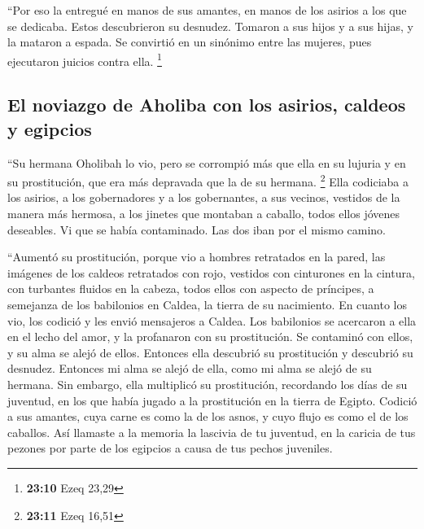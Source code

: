 \begin{paracol}{2}
 ``Por eso la entregué en manos de sus amantes, en manos
de los asirios a los que se dedicaba.  Estos descubrieron
su desnudez. Tomaron a sus hijos y a sus hijas, y la mataron a espada.
Se convirtió en un sinónimo entre las mujeres, pues ejecutaron juicios
contra ella. \footnote{\textbf{23:10} Ezeq 23,29}

\hypertarget{el-noviazgo-de-aholiba-con-los-asirios-caldeos-y-egipcios}{%
\subsection{El noviazgo de Aholiba con los asirios, caldeos y
egipcios}\label{el-noviazgo-de-aholiba-con-los-asirios-caldeos-y-egipcios}}

 ``Su hermana Oholibah lo vio, pero se corrompió más que
ella en su lujuria y en su prostitución, que era más depravada que la de
su hermana. \footnote{\textbf{23:11} Ezeq 16,51}  Ella
codiciaba a los asirios, a los gobernadores y a los gobernantes, a sus
vecinos, vestidos de la manera más hermosa, a los jinetes que montaban a
caballo, todos ellos jóvenes deseables.  Vi que se había
contaminado. Las dos iban por el mismo camino.

 ``Aumentó su prostitución, porque vio a hombres
retratados en la pared, las imágenes de los caldeos retratados con rojo,
 vestidos con cinturones en la cintura, con turbantes
fluidos en la cabeza, todos ellos con aspecto de príncipes, a semejanza
de los babilonios en Caldea, la tierra de su nacimiento. 
En cuanto los vio, los codició y les envió mensajeros a Caldea.
 Los babilonios se acercaron a ella en el lecho del amor,
y la profanaron con su prostitución. Se contaminó con ellos, y su alma
se alejó de ellos.  Entonces ella descubrió su
prostitución y descubrió su desnudez. Entonces mi alma se alejó de ella,
como mi alma se alejó de su hermana.  Sin embargo, ella
multiplicó su prostitución, recordando los días de su juventud, en los
que había jugado a la prostitución en la tierra de Egipto.
 Codició a sus amantes, cuya carne es como la de los
asnos, y cuyo flujo es como el de los caballos.  Así
llamaste a la memoria la lascivia de tu juventud, en la caricia de tus
pezones por parte de los egipcios a causa de tus pechos juveniles.

\hypertarget{anuncio-del-juicio-divino-que-se-llevaruxe1-a-cabo-sobre-aholibah-a-travuxe9s-de-babilonia}{%
}
\end{paracol}
